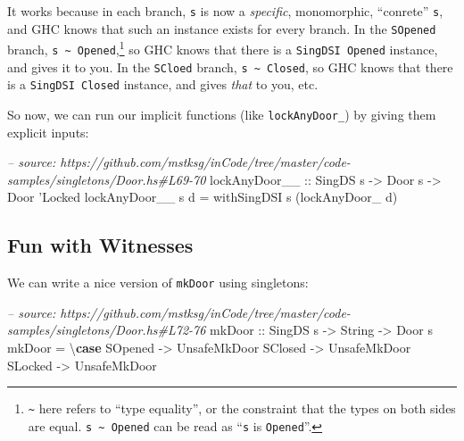 \documentclass[]{article}
\newenvironment{Shaded}{}{}
\newcommand{\KeywordTok}[1]{\textcolor[rgb]{0.00,0.44,0.13}{\textbf{#1}}}
\newcommand{\DataTypeTok}[1]{\textcolor[rgb]{0.56,0.13,0.00}{#1}}
\newcommand{\CharTok}[1]{\textcolor[rgb]{0.25,0.44,0.63}{#1}}
\newcommand{\CommentTok}[1]{\textcolor[rgb]{0.38,0.63,0.69}{\textit{#1}}}
\newcommand{\OtherTok}[1]{\textcolor[rgb]{0.00,0.44,0.13}{#1}}
\newcommand{\FunctionTok}[1]{\textcolor[rgb]{0.02,0.16,0.49}{#1}}
\newcommand{\NormalTok}[1]{#1}
\begin{document}
It works because in each branch, \texttt{s} is now a \emph{specific},
monomorphic, ``conrete'' \texttt{s}, and GHC knows that such an instance exists
for every branch. In the \texttt{SOpened} branch,
\texttt{s\ \textasciitilde{}\ \textquotesingle{}Opened},\footnote{\texttt{\textasciitilde{}}
  here refers to ``type equality'', or the constraint that the types on both
  sides are equal. \texttt{s\ \textasciitilde{}\ \textquotesingle{}Opened} can
  be read as ``\texttt{s} is \texttt{\textquotesingle{}Opened}''.} so GHC knows
that there is a \texttt{SingDSI\ \textquotesingle{}Opened} instance, and gives
it to you. In the \texttt{SCloed} branch,
\texttt{s\ \textasciitilde{}\ \textquotesingle{}Closed}, so GHC knows that there
is a \texttt{SingDSI\ \textquotesingle{}Closed} instance, and gives \emph{that}
to you, etc.

So now, we can run our implicit functions (like \texttt{lockAnyDoor\_}) by
giving them explicit inputs:

\begin{Shaded}
\begin{Highlighting}[]
\CommentTok{-- source: https://github.com/mstksg/inCode/tree/master/code-samples/singletons/Door.hs#L69-70}
\OtherTok{lockAnyDoor__ ::} \DataTypeTok{SingDS}\NormalTok{ s }\OtherTok{->} \DataTypeTok{Door}\NormalTok{ s }\OtherTok{->} \DataTypeTok{Door} \CharTok{'Locked}
\NormalTok{lockAnyDoor__ s d }\FunctionTok{=}\NormalTok{ withSingDSI s (lockAnyDoor_ d)}
\end{Highlighting}
\end{Shaded}

\subsection{Fun with Witnesses}\label{fun-with-witnesses}

We can write a nice version of \texttt{mkDoor} using singletons:

\begin{Shaded}
\begin{Highlighting}[]
\CommentTok{-- source: https://github.com/mstksg/inCode/tree/master/code-samples/singletons/Door.hs#L72-76}
\OtherTok{mkDoor ::} \DataTypeTok{SingDS}\NormalTok{ s }\OtherTok{->} \DataTypeTok{String} \OtherTok{->} \DataTypeTok{Door}\NormalTok{ s}
\NormalTok{mkDoor }\FunctionTok{=}\NormalTok{ \textbackslash{}}\KeywordTok{case}
    \DataTypeTok{SOpened} \OtherTok{->} \DataTypeTok{UnsafeMkDoor}
    \DataTypeTok{SClosed} \OtherTok{->} \DataTypeTok{UnsafeMkDoor}
    \DataTypeTok{SLocked} \OtherTok{->} \DataTypeTok{UnsafeMkDoor}
\end{Highlighting}
\end{Shaded}
\end{document}
